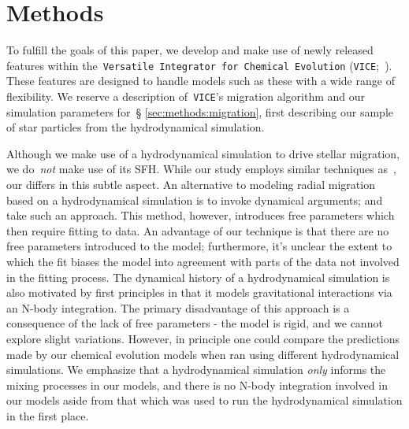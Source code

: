 \documentclass[fleqn, usenatbib]{mnras}
\begin{document}
\section{Methods} 
\label{sec:methods} 
To fulfill the goals of this paper, we develop and make use of newly released 
features within the~\texttt{Versatile Integrator for Chemical Evolution} 
(\texttt{VICE};~\citealp{Johnson2020}). These features are designed to handle 
models such as these with a wide range of flexibility. We reserve a description 
of~\texttt{VICE}'s migration algorithm and our simulation parameters for~\S 
\ref{sec:methods:migration}, first describing our sample of star particles from 
the hydrodynamical simulation. 
\par 
Although we make use of a hydrodynamical 
simulation to drive stellar migration, we do~\textit{not} make use of its SFH. 
While our study employs similar techniques as~\citet{Minchev2013}, our differs 
in this subtle aspect. An alternative to modeling radial migration based on a 
hydrodynamical simulation is to invoke dynamical arguments; 
\citet{Schoenrich2009} and~\citet{Sharma2020} take such an approach. This 
method, however, introduces free parameters which then require fitting to 
data. An advantage of our technique is that there are no free parameters 
introduced to the model; furthermore, it's unclear the extent to which the fit 
biases the model into agreement with parts of the data not involved in the 
fitting process. The dynamical history of a hydrodynamical simulation is also 
motivated by first principles in that it models gravitational interactions via 
an N-body integration. The primary disadvantage of this approach is a 
consequence of the lack of free parameters - the model is rigid, and we cannot 
explore slight variations. However, in principle one could compare the 
predictions made by our chemical evolution models when ran using different 
hydrodynamical simulations. We emphasize that a hydrodynamical simulation 
\textit{only} informs the mixing processes in our models, and there is no 
N-body integration involved in our models aside from that which was used to run 
the hydrodynamical simulation in the first place. 
\end{document}

